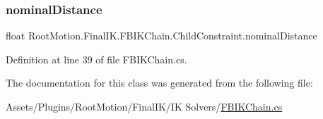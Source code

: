 \subsubsection{\texorpdfstring{nominal\+Distance}{nominalDistance}}
{\footnotesize\ttfamily float Root\+Motion.\+Final\+I\+K.\+F\+B\+I\+K\+Chain.\+Child\+Constraint.\+nominal\+Distance\hspace{0.3cm}{\ttfamily [get]}}



Definition at line 39 of file F\+B\+I\+K\+Chain.\+cs.



The documentation for this class was generated from the following file\+:\begin{DoxyCompactItemize}
\item 
Assets/\+Plugins/\+Root\+Motion/\+Final\+I\+K/\+I\+K Solvers/\mbox{\hyperlink{_f_b_i_k_chain_8cs}{F\+B\+I\+K\+Chain.\+cs}}\end{DoxyCompactItemize}
